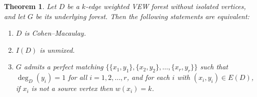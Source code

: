 \documentclass[11pt,reqno]{amsart}
\newtheorem{theorem}{Theorem}[section]
\theoremstyle{definition}
\begin{document}
\begin{theorem}\label{cm-forest}
Let $D$ be a $k$-edge weighted VEW forest without isolated vertices, and let $G$ be its underlying forest. Then the following statements are equivalent:
\begin{enumerate}
    \item $D$ is Cohen--Macaulay.
    
    \item $I(D)$ is unmixed.
    
    \item $G$ admits a perfect matching $\{\{x_1,y_1\}, \{x_2,y_2\}, \ldots, \{x_r,y_r\}\}$ such that 
    $\deg_D(y_i)=1$ for all $i=1,2,\ldots,r$, and for each $i$ with $(x_i,y_i) \in E(D)$, if $x_i$ is not a source vertex then $w(x_i)=k$.
\end{enumerate}
\end{theorem}
\end{document}
